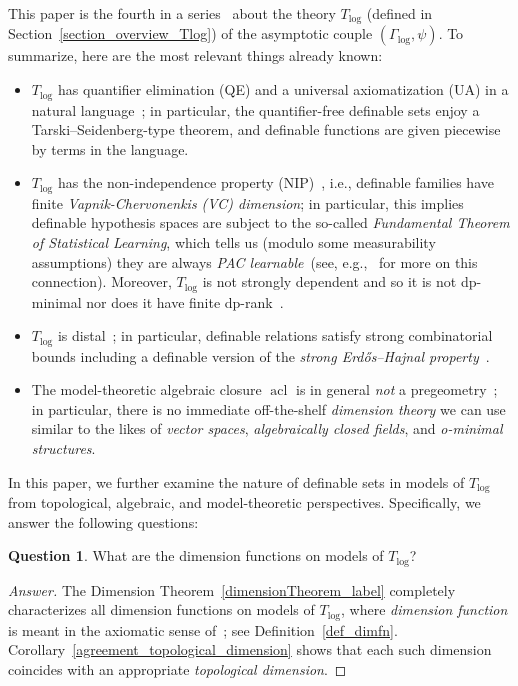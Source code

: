 \documentclass[11pt]{amsart}
\theoremstyle{plain}
\theoremstyle{definition}
\newtheorem*{question*}{Question}
\numberwithin{equation}{section}
\newcommand\0{\varnothing}
\begin{document}
\medskip\noindent
This paper is the fourth in a series~\cite{GehretACTlog,GehretACTlogNIP,GehretKaplan-ACTlogdistal} about the theory $T_{\log}$ (defined in Section~\ref{section_overview_Tlog}) of the asymptotic couple $(\Gamma_{\log},\psi)$. To summarize, here are the most relevant things already known:
\begin{itemize}
\item $T_{\log}$ has quantifier elimination (QE) and a universal axiomatization (UA) in a natural language~\cite{GehretACTlog}; in particular, the quantifier-free definable sets enjoy a Tarski--Seidenberg-type theorem, and definable functions are given piecewise by terms in the language.
\item $T_{\log}$ has the non-independence property (NIP)~\cite{GehretACTlogNIP}, i.e., definable families have finite \emph{Vapnik-Chervonenkis (VC) dimension}; in particular, this implies definable hypothesis spaces are subject to the so-called \emph{Fundamental Theorem of Statistical Learning}, which tells us (modulo some measurability assumptions) they are always \emph{PAC learnable}~(see, e.g.,~\cite{chase2019model,krapp2024measurability} for more on this connection). 
Moreover, $T_{\log}$ is not strongly dependent and so it is not dp-minimal nor does it have finite dp-rank~\cite{GehretKaplan-ACTlogdistal}.
\item $T_{\log}$ is distal~\cite{GehretKaplan-ACTlogdistal}; in particular, definable relations satisfy strong combinatorial bounds including a definable version of the \emph{strong Erdős--Hajnal property}~\cite{chernikov2018regularity,chernikov2020cutting}. 
\item The model-theoretic algebraic closure $\operatorname{acl}$ is in general \emph{not} a pregeometry~\cite{GehretACTlogNIP}; in particular, there is no immediate off-the-shelf \emph{dimension theory} we can use similar to the likes of \emph{vector spaces},  \emph{algebraically closed fields}, and \emph{o-minimal structures}.
\end{itemize}

\noindent
In this paper, we further examine the nature of definable sets in models of $T_{\log}$ from topological, algebraic, and model-theoretic perspectives.
Specifically, we answer the following questions:

\begin{question*}
What are the dimension functions on models of $T_{\log}$?
\end{question*}
\begin{proof}[Answer]\renewcommand{\qedsymbol}{}
The Dimension Theorem~\ref{dimensionTheorem_label} completely characterizes all dimension functions on models of $T_{\log}$, where \emph{dimension function} is meant in the axiomatic sense of~\cite{vdD89}; see Definition~\ref{def_dimfn}.
Corollary~\ref{agreement_topological_dimension} shows that each such dimension coincides with an appropriate \emph{topological dimension}.
\end{proof}
\end{document}
